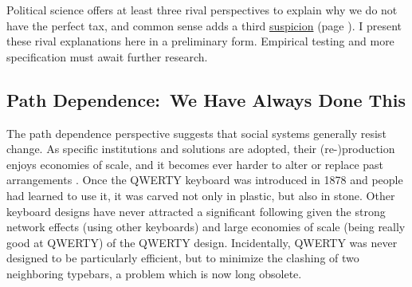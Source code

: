 



Political science offers at least three rival perspectives to explain why we do not have the perfect tax, and common sense adds a third \hyperref[sec:Conspiracy]{suspicion} (page \pageref{sec:Conspiracy}).
I present these rival explanations here in a preliminary form.
Empirical testing and more specification must await further research.

\subsection[Path Dependence]{Path Dependence:\ We Have Always Done This} The path dependence perspective suggests that social systems generally resist change.
As specific institutions and solutions are adopted, their (re-)production enjoys economies of scale, and it becomes ever harder to alter or replace past arrangements \citep{Mahoney-2000-aa,Pierson-2000-aa}.
Once the QWERTY keyboard was introduced in 1878 and people had learned to use it, it was carved not only in plastic, but also in stone.
Other keyboard designs have never attracted a significant following given the strong network effects (using other keyboards) and large economies of scale (being really good at QWERTY) of the QWERTY design.
Incidentally, QWERTY was never designed to be particularly efficient, but to minimize the clashing of two neighboring typebars, a problem which is now long obsolete.

